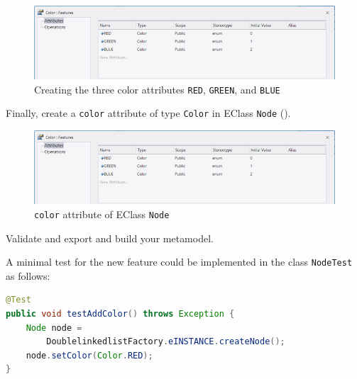 \begin{stepbystep}
\begin{figure}[htbp]
    \begin{center} 
        \includegraphics[width=.8\textwidth]{../../org.moflon.doc.handbook.05_miscellaneous/9_CreatingAndUsingEnums/images/visEnumAttributes}
        \caption{Creating the three color attributes \texttt{RED},
        \texttt{GREEN}, and \texttt{BLUE}}
        \label{enums:vis:enumAttributes}
    \end{center}
\end{figure}

\item 
Finally, create a \texttt{color} attribute of type \texttt{Color} in EClass
\texttt{Node} ().


\begin{figure}[htbp]
    \begin{center} 
        \includegraphics[width=.8\textwidth]{../../org.moflon.doc.handbook.05_miscellaneous/9_CreatingAndUsingEnums/images/visEnumAttributes}
        \caption{\texttt{color} attribute of EClass \texttt{Node}}
        \label{enums:vis:colorAttribute}
    \end{center}
\end{figure}

\item 
Validate and export and build your metamodel.

\item 
A minimal test for the new feature could be implemented in the class
\texttt{NodeTest} as follows:
\begin{lstlisting}[language=Java,caption={Test for coloring nodes}]
@Test
public void testAddColor() throws Exception {
	Node node = 
	    DoublelinkedlistFactory.eINSTANCE.createNode();
	node.setColor(Color.RED);
}
\end{lstlisting}

\end{stepbystep}